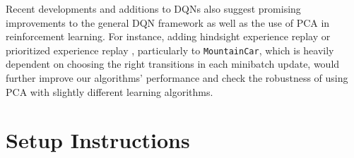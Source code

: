 \documentclass[11pt]{article}
\newcommand{\mc}{\texttt{MountainCar}}
\begin{document}
Recent developments and additions to DQNs also suggest promising improvements to the general DQN framework as well as the use of PCA in reinforcement learning. For instance, adding hindsight experience replay \cite{andrychowicz2017hindsight} or prioritized experience replay \cite{schaul2015prioritized}, particularly to \mc, which is heavily dependent on choosing the right transitions in each minibatch update, would further improve our algorithms' performance and check the robustness of using PCA with slightly different learning algorithms.

\newpage
{}


\onecolumn

\appendix

\section{Setup Instructions}
\label{app:getting_started}
\end{document}
